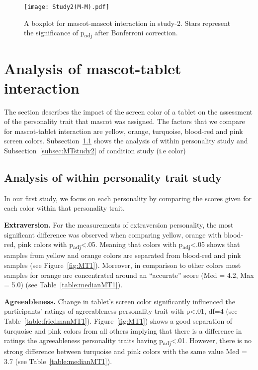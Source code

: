 \begin{figure}[H]
    \centering
    \texttt{[image: Study2(M-M).pdf]}
    \caption[]{A boxplot for mascot-mascot interaction in study-2.
    Stars represent the significance of p\textsubscript{adj} after Bonferroni correction.\footnotemark}
    \label{fig:MM2}
\end{figure}
\section{Analysis of mascot-tablet interaction}
\label{sec:m-t}
The section describes the impact of the screen color of a tablet on the assessment of the personality trait that
mascot was assigned.
The factors that we compare for mascot-tablet interaction are yellow,
orange, turquoise, blood-red and pink screen colors.
Subsection~\ref{subsec:MTstudy1} shows the analysis of within personality study and Subsection~\ref{subsec:MTstudy2} of condition study (i.e color)

\subsection{Analysis of within personality trait study}
\label{subsec:MTstudy1}
In our first study, we focus on each personality by comparing the scores given
for each color within that personality trait.

\par\textbf{Extraversion.}
For the measurements of extraversion personality,
the most significant difference was observed when comparing yellow, orange with
blood-red, pink colors with p\textsubscript{adj}<.05.
Meaning that colors with p\textsubscript{adj}<.05 shows that samples from yellow and orange colors are separated
from blood-red and pink samples (see Figure~\ref{fig:MT1}).
Moreover, in comparison to other colors most samples for orange are concentrated around
an “accurate” score (Med = 4.2, Max = 5.0) (see Table~\ref{table:medianMT1}).

\par\textbf{Agreeableness.}
Change in tablet's screen color significantly influenced the participants' ratings of
agreeableness personality trait with p<.01, df=4 (see Table~\ref{table:friedmanMT1}).
Figure~\ref{fig:MT1}) shows a good separation of turquoise and pink colors
from all others implying that there is a difference in ratings the
agreeableness personality traits having p\textsubscript{adj}<.01.
However, there is no strong difference between turquoise and pink colors with
the same value Med = 3.7 (see Table~\ref{table:medianMT1}).

